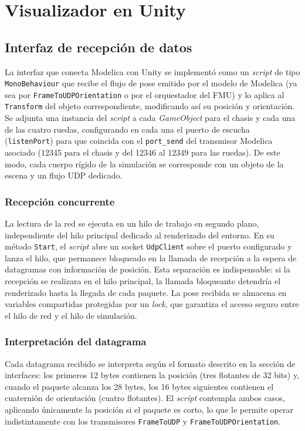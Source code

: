 \section{Visualizador en Unity}

\subsection{Interfaz de recepción de datos}

La interfaz que conecta Modelica con Unity se implementó como un \textit{script} de tipo \verb|MonoBehaviour| que recibe el flujo de pose emitido por el modelo de Modelica (ya sea por \verb|FrameToUDPOrientation| o por el orquestador del FMU) y lo aplica al \verb|Transform| del objeto correspondiente, modificando así su posición y orientación.  Se adjunta una instancia del \textit{script} a cada \textit{GameObject} para el chasis y cada una de las cuatro ruedas, configurando en cada una el puerto de escucha (\verb|listenPort|) para que coincida con el \verb|port_send| del transmisor Modelica asociado (12345 para el chasis y del 12346 al 12349 para las ruedas). De este modo, cada cuerpo rígido de la simulación se corresponde con un objeto de la escena y un flujo UDP dedicado.


\subsubsection*{Recepción concurrente}

La lectura de la red se ejecuta en un hilo de trabajo en segundo plano, independiente del hilo principal dedicado al renderizado del entorno. En su método \verb|Start|,  el \textit{script} abre un socket \verb|UdpClient| sobre el puerto configurado y lanza el hilo, que permanece bloqueado en la llamada de recepción a la espera de datagramas con información de posición. Esta separación es indispensable: si la recepción se realizara en el hilo principal, la llamada bloqueante detendría el renderizado hasta la llegada de cada paquete. La pose recibida se almacena en variables compartidas protegidas por un \textit{lock}, que garantiza el acceso seguro entre el hilo de red y el hilo de simulación.

\subsubsection*{Interpretación del datagrama}

Cada datagrama recibido se interpreta según el formato descrito en la sección de interfaces:  los primeros 12 bytes contienen la posición (tres flotantes de 32 bits) y, cuando el paquete alcanza los 28 bytes, los 16 bytes siguientes contienen el cuaternión de orientación (cuatro flotantes). El \textit{script} contempla ambos casos, aplicando únicamente la posición si el paquete es corto, lo que le permite operar indistintamente con los transmisores \verb|FrameToUDP| y \verb|FrameToUDPOrientation|.

